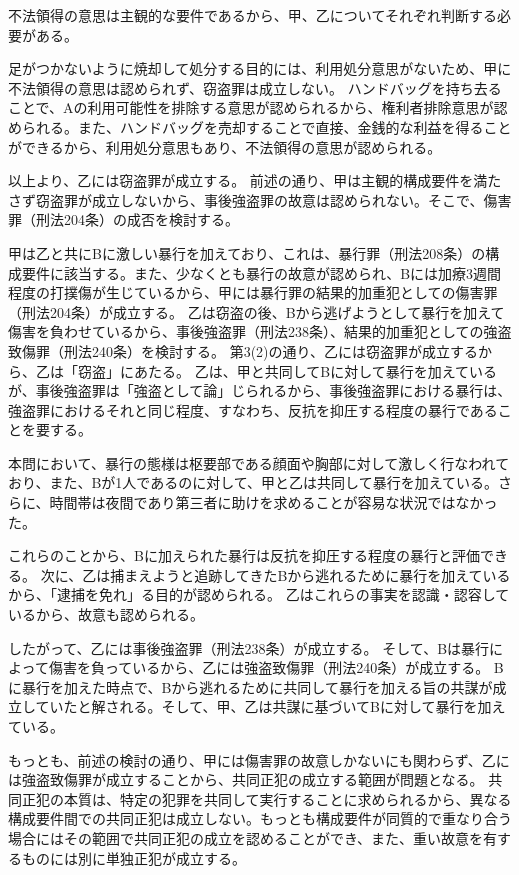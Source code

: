 \documentclass[11pt]{jsarticle}
\begin{document}
		不法領得の意思は主観的な要件であるから、甲、乙についてそれぞれ判断する必要がある。
		
				足がつかないように焼却して処分する目的には、利用処分意思がないため、甲に不法領得の意思は認められず、窃盗罪は成立しない。
				ハンドバッグを持ち去ることで、Aの利用可能性を排除する意思が認められるから、権利者排除意思が認められる。また、ハンドバッグを売却することで直接、金銭的な利益を得ることができるから、利用処分意思もあり、不法領得の意思が認められる。
				
				以上より、乙には窃盗罪が成立する。
		前述の通り、甲は主観的構成要件を満たさず窃盗罪が成立しないから、事後強盗罪の故意は認められない。そこで、傷害罪（刑法204条）の成否を検討する。
		
		甲は乙と共にBに激しい暴行を加えており、これは、暴行罪（刑法208条）の構成要件に該当する。また、少なくとも暴行の故意が認められ、Bには加療3週間程度の打撲傷が生じているから、甲には暴行罪の結果的加重犯としての傷害罪（刑法204条）が成立する。
		乙は窃盗の後、Bから逃げようとして暴行を加えて傷害を負わせているから、事後強盗罪（刑法238条）、結果的加重犯としての強盗致傷罪（刑法240条）を検討する。
		\sectionC{}
			第3(2)の通り、乙には窃盗罪が成立するから、乙は「窃盗」にあたる。
		\sectionC{}
			乙は、甲と共同してBに対して暴行を加えているが、事後強盗罪は「強盗として論」じられるから、事後強盗罪における暴行は、強盗罪におけるそれと同じ程度、すなわち、反抗を抑圧する程度の暴行であることを要する。
			
			本問において、暴行の態様は枢要部である顔面や胸部に対して激しく行なわれており、また、Bが1人であるのに対して、甲と乙は共同して暴行を加えている。さらに、時間帯は夜間であり第三者に助けを求めることが容易な状況ではなかった。
			
			これらのことから、Bに加えられた暴行は反抗を抑圧する程度の暴行と評価できる。
		\sectionC{}
			次に、乙は捕まえようと追跡してきたBから逃れるために暴行を加えているから、「逮捕を免れ」る目的が認められる。
		\sectionC{}
			乙はこれらの事実を認識・認容しているから、故意も認められる。
				
			したがって、乙には事後強盗罪（刑法238条）が成立する。
		\sectionC{}
			そして、Bは暴行によって傷害を負っているから、乙には強盗致傷罪（刑法240条）が成立する。
		Bに暴行を加えた時点で、Bから逃れるために共同して暴行を加える旨の共謀が成立していたと解される。そして、甲、乙は共謀に基づいてBに対して暴行を加えている。
		
		もっとも、前述の検討の通り、甲には傷害罪の故意しかないにも関わらず、乙には強盗致傷罪が成立することから、共同正犯の成立する範囲が問題となる。
		共同正犯の本質は、特定の犯罪を共同して実行することに求められるから、異なる構成要件間での共同正犯は成立しない。もっとも構成要件が同質的で重なり合う場合にはその範囲で共同正犯の成立を認めることができ、また、重い故意を有するものには別に単独正犯が成立する。
		
\end{document}
